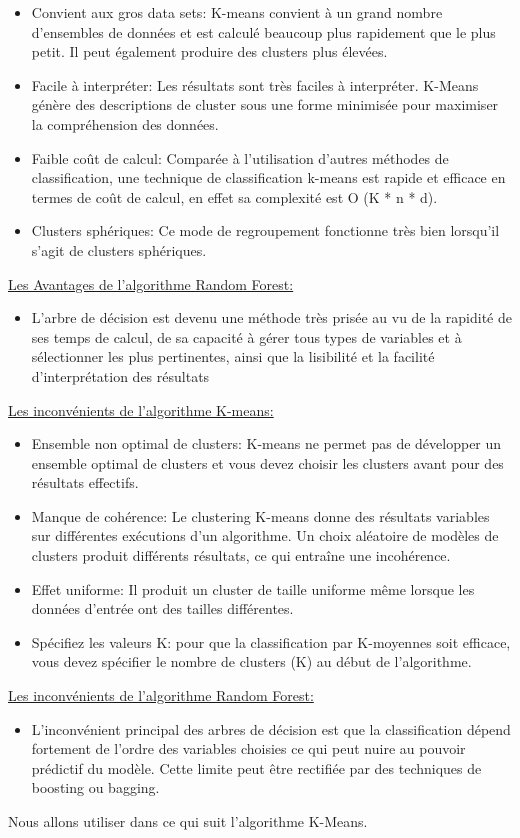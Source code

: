 \begin{enumerate}
\begin{itemize}
\item Convient aux gros data sets:
K-means convient à un grand nombre d’ensembles de données et est calculé beaucoup plus rapidement que le plus petit. Il peut également produire des clusters plus élevées.
\item Facile à interpréter:
Les résultats sont très faciles à interpréter. K-Means génère des descriptions de cluster sous une forme minimisée pour maximiser la compréhension des données.
\item Faible coût de calcul:
Comparée à l’utilisation d’autres méthodes de classification, une technique de classification k-means est rapide et efficace en termes de coût de calcul, en effet sa complexité est O (K * n * d).
\item Clusters sphériques:
Ce mode de regroupement fonctionne très bien lorsqu’il s’agit de clusters sphériques.
\end{itemize}
\underline {Les Avantages de l'algorithme Random Forest:}
\begin{itemize}
    \item L'arbre de décision est devenu une méthode
très prisée au vu de la rapidité de ses temps de calcul, de
sa capacité à gérer tous types de variables et à sélectionner
les plus pertinentes, ainsi que la lisibilité et la facilité
d'interprétation des résultats
\end{itemize}
\underline {Les inconvénients de l'algorithme K-means:}
\begin{itemize}
    \item Ensemble non optimal de clusters:
K-means ne permet pas de développer un ensemble optimal de clusters et vous devez choisir les clusters avant pour des résultats effectifs.
\item Manque de cohérence:
Le clustering K-means donne des résultats variables sur différentes exécutions d’un algorithme. Un choix aléatoire de modèles de clusters produit différents résultats, ce qui entraîne une incohérence.


\item Effet uniforme:
Il produit un cluster de taille uniforme même lorsque les données d’entrée ont des tailles différentes.
\item Spécifiez les valeurs K:
pour que la classification par K-moyennes soit efficace, vous devez spécifier le nombre de clusters (K) au début de l’algorithme.
\end{itemize}
\underline {Les inconvénients de l'algorithme Random Forest:}
\begin{itemize}
    \item L'inconvénient principal des arbres de
décision est que la classification dépend fortement de
l'ordre des variables choisies ce qui peut nuire au pouvoir
prédictif du modèle. Cette limite peut être rectifiée par des
techniques de boosting ou bagging.


\end{itemize}
Nous allons utiliser dans ce qui suit l'algorithme K-Means.

\end{enumerate}
